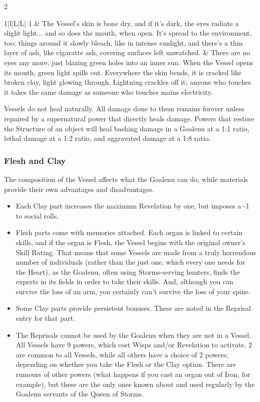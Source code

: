 \begin{multicols}{2}
\begin{tabulary}{1\textwidth}{|l|L|L|}
        1          & The Vessel's skin is bone dry, and if it's dark, the eyes radiate a slight light... and so does the mouth, when open. It's spread to the environment, too; things around it slowly bleach, like in intense sunlight, and there's a thin layer of ash, like cigaratte ash, covering surfaces left unwatched.  & There are no eyes any more, just blazing green holes into an inner sun. When the Vessel opens its mouth, green light spills out. Everywhere the skin bends, it is cracked like broken clay, light glowing through. Lightning crackles off it; anyone who touches it takes the same damage as someone who touches mains electricity.  \\
        \hline
    \end{tabulary}
\bigsidebarend

Vessels do not heal naturally. All damage done to them remains forever unless repaired by a supernatural power that directly heals damage. Powers that restore the Structure of an object will heal bashing damage in a Goalenu at a 1:1 ratio, lethal damage at a 1:2 ratio, and aggravated damage at a 1:8 ratio.

\subsubsection*{Flesh and Clay}

The composition of the Vessel affects what the Goalenu can do, while materials provide their own advantages and disadvantages. 

\begin{itemize}
 \item     Each Clay part increases the maximum Revelation by one, but imposes a -1 to social rolls. 
    \item     Flesh parts come with memories attached. Each organ is linked to certain skills, and if the organ is Flesh, the Vessel begins with the original owner’s Skill Rating. That means that some Vessels are made from a truly horrendous number of individuals (rather than the just one, which every one needs for the Heart), as the Goalenu, often using Storms-serving hunters, finds the experts in its fields in order to take their skills. And, although you can survive the loss of an arm, you certainly can’t survive the loss of your spine.
    \item     Some Clay parts provide persistent bonuses. These are noted in the Reprisal entry for that part.
    \item     The Reprisals cannot be used by the Goalenu when they are not in a Vessel. All Vessels have 9 powers, which cost Wisps and/or Revelation to activate. 2 are common to all Vessels, while all others have a choice of 2 powers; depending on whether you take the Flesh or the Clay option. There are rumours of other powers (what happens if you cast an organ out of Iron, for example), but these are the only ones known about and used regularly by the Goalenu servants of the Queen of Storms. 
\end{itemize}


\end{multicols}
